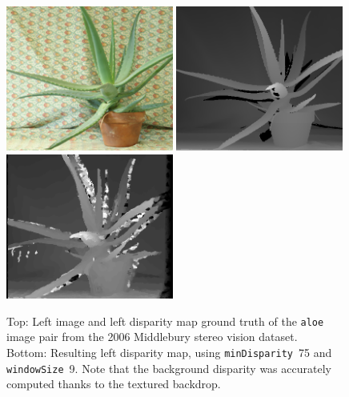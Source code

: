 \documentclass[english, paper=a4]{scrartcl}
\begin{document}
\begin{figure}[H]
\centering
\includegraphics[width=0.49\textwidth]{aloe_left.png}
\label{fig:aloe_left}
\includegraphics[width=0.49\textwidth]{aloe_groundtruth_left.png}
\label{fig:aloe_groundtruth_left}
\includegraphics[width=0.49\textwidth]{aloe_result_left_winsize9_mindisp75.png}
\label{fig:aloe_result_left_winsize9_mindisp75}
\caption{Top: Left image and left disparity map ground truth of the \texttt{aloe} image pair from the 2006 Middlebury stereo vision dataset.\\
Bottom: Resulting left disparity map, using \texttt{minDisparity}~75 and \texttt{windowSize}~9. Note that the background disparity was accurately computed thanks to the textured backdrop.}
\end{figure}
\end{document}
